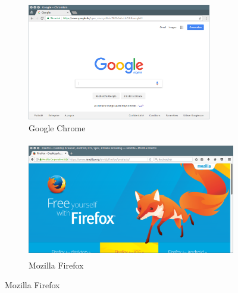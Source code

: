 \documentclass[12pt]{article}
\begin{document}
            \begin{figure}[H]
                \centering
                \begin{subfigure}[b]{0.49\textwidth}
                    \centering
                    \includegraphics[width=\textwidth, height=2in]{img/1_chrome.png}
                    \caption{Google Chrome}
                \end{subfigure}
                \hfill
                \begin{subfigure}[b]{0.49\textwidth}
                    \centering
                    \includegraphics[width=\textwidth, height=2in]{img/2_firefox.png}
                    \caption{Mozilla Firefox}
                \end{subfigure}
            \end{figure}
\end{document}
